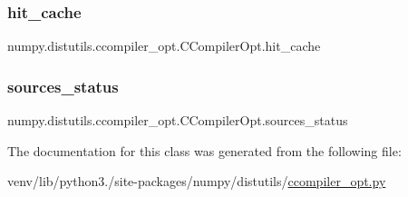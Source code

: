 \subsubsection{\texorpdfstring{hit\+\_\+cache}{hit\_cache}}
{\footnotesize\ttfamily numpy.\+distutils.\+ccompiler\+\_\+opt.\+C\+Compiler\+Opt.\+hit\+\_\+cache}

\mbox{\label{classnumpy_1_1distutils_1_1ccompiler__opt_1_1CCompilerOpt_a5f51fa3677a680989f1565e1622fb9b1}} 
\subsubsection{\texorpdfstring{sources\+\_\+status}{sources\_status}}
{\footnotesize\ttfamily numpy.\+distutils.\+ccompiler\+\_\+opt.\+C\+Compiler\+Opt.\+sources\+\_\+status}



The documentation for this class was generated from the following file\+:\begin{DoxyCompactItemize}
\item 
venv/lib/python3./site-\/packages/numpy/distutils/\hyperlink{ccompiler__opt_8py}{ccompiler\+\_\+opt.\+py}\end{DoxyCompactItemize}
